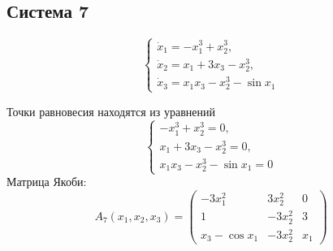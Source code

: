 
\subsection{Система 7}

\begin{equation}
  \begin{cases}
    \dot x_1=-x_1^3+x_2^3,\\
    \dot x_2=x_1+3x_3-x_2^3,\\
    \dot x_3=x_1x_3-x_2^3-\sin x_1
  \end{cases}
  \label{eq:system-7}
\end{equation}

Точки равновесия находятся из уравнений
\begin{equation}
  \begin{cases}
    -x_1^3+x_2^3=0,\\
    x_1+3x_3-x_2^3=0,\\
    x_1x_3-x_2^3-\sin x_1=0
  \end{cases}
\end{equation}
Матрица Якоби:
\begin{equation}
  A_7(x_1,x_2,x_3)=
  \begin{pmatrix}
    -3x_1^2 & 3x_2^2 & 0\\
    1 & -3x_2^2 & 3\\
    x_3-\cos x_1 & -3x_2^2 & x_1
  \end{pmatrix}
\end{equation}

